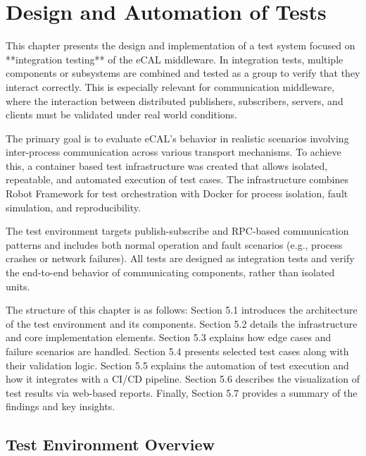 \clearpage
\section{Design and Automation of Tests}

This chapter presents the design and implementation of a test system focused on **integration testing** of the eCAL middleware. In integration tests, multiple components or subsystems are combined and tested as a group to verify that they interact correctly. This is especially relevant for communication middleware, where the interaction between distributed publishers, subscribers, servers, and clients must be validated under real world conditions.

\vspace{0.9em}
The primary goal is to evaluate eCAL’s behavior in realistic scenarios involving inter-process communication across various transport mechanisms. To achieve this, a container based test infrastructure was created that allows isolated, repeatable, and automated execution of test cases. The infrastructure combines Robot Framework for test orchestration with Docker for process isolation, fault simulation, and reproducibility.

\vspace{0.9em}
The test environment targets publish-subscribe and RPC-based communication patterns and includes both normal operation and fault scenarios (e.g., process crashes or network failures). All tests are designed as integration tests and verify the end-to-end behavior of communicating components, rather than isolated units.

\vspace{0.9em}
The structure of this chapter is as follows: Section 5.1 introduces the architecture of the test environment and its components. Section 5.2 details the infrastructure and core implementation elements. Section 5.3 explains how edge cases and failure scenarios are handled. Section 5.4 presents selected test cases along with their validation logic. Section 5.5 explains the automation of test execution and how it integrates with a CI/CD pipeline. Section 5.6 describes the visualization of test results via web-based reports. Finally, Section 5.7 provides a summary of the findings and key insights.

\subsection{Test Environment Overview}

